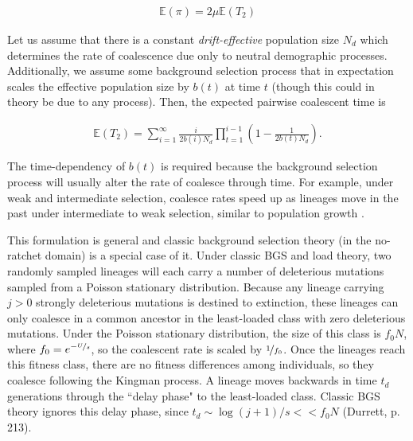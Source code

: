 \documentclass[11pt]{article}
\newcommand{\E}{\mathbb{E}}
\begin{document}
\begin{align}
  \E(\pi) = 2 \mu \E(T_2)
\end{align}

Let us assume that there is a constant \emph{drift-effective} population size
$N_d$ which determines the rate of coalescence due only to neutral demographic
processes. Additionally, we assume some background selection process that in
expectation scales the effective population size by $b(t)$ at time $t$ (though
this could in theory be due to any process). Then, the expected pairwise
coalescent time is

\begin{align}
  \label{eq:T_2}
  \E(T_2) = \sum_{i=1}^\infty \frac{i}{2 b(i) N_d}\prod_{t=1}^{i-1} \left(1-\frac{1}{2 b(t) N_d}\right).
\end{align}

The time-dependency of $b(t)$ is required because the background selection
process will usually alter the rate of coalesce through time. For example,
under weak and intermediate selection, coalesce rates speed up as lineages move
in the past under intermediate to weak selection, similar to population growth
\parencite{Walczak2012-fi,Seger2010-rs,Good2014-yz}. 


This formulation is general and classic background selection theory (in the
no-ratchet domain) is a special case of it. Under classic BGS and load theory,
two randomly sampled lineages will each carry a number of deleterious mutations
sampled from a Poisson stationary distribution. Because any lineage carrying $j
> 0$ strongly deleterious mutations is destined to extinction, these lineages
can only coalesce in a common ancestor in the least-loaded class with zero
deleterious mutations. Under the Poisson stationary distribution, the size of
this class is $f_0 N$, where $f_0 = e^{-\nicefrac{U}{s}}$, so the coalescent
rate is scaled by $\nicefrac{1}{f_0}$. Once the lineages reach this fitness
class, there are no fitness differences among individuals, so they coalesce
following the Kingman process. A lineage moves backwards in time $t_d$
generations through the ``delay phase" to the least-loaded class. Classic BGS
theory ignores this delay phase, since $t_d \sim \log(j+1)/s << f_0 N$
(Durrett, p. 213). 
\end{document}
